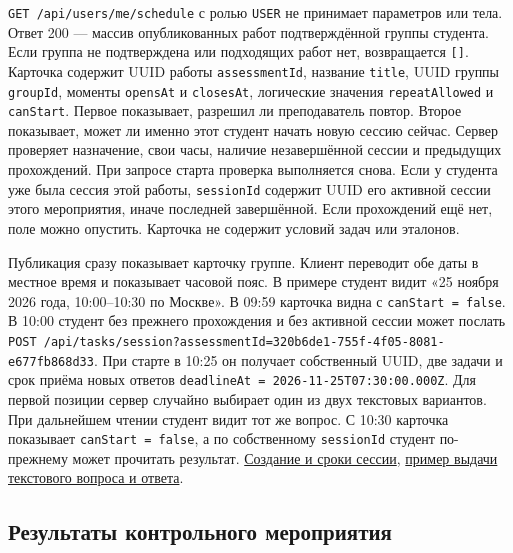 \documentclass[12pt,a4paper]{article}
\begin{document}
\hypertarget{расписание-студента}{}

\texttt{GET /\allowbreak{}api/\allowbreak{}users/\allowbreak{}me/\allowbreak{}schedule} с ролью \texttt{USER} не принимает параметров или тела. Ответ 200 --- массив опубликованных работ подтверждённой группы студента. Если группа не подтверждена или подходящих работ нет, возвращается \texttt{{[}{]}}. Карточка содержит UUID работы \texttt{assessment\allowbreak{}Id}, название \texttt{title}, UUID группы \texttt{groupId}, моменты \texttt{opensAt} и \texttt{closesAt}, логические значения \texttt{repeat\allowbreak{}Allowed} и \texttt{canStart}. Первое показывает, разрешил ли преподаватель повтор. Второе показывает, может ли именно этот студент начать новую сессию сейчас. Сервер проверяет назначение, свои часы, наличие незавершённой сессии и предыдущих прохождений. При запросе старта проверка выполняется снова. Если у студента уже была сессия этой работы, \texttt{sessionId} содержит UUID его активной сессии этого мероприятия, иначе последней завершённой. Если прохождений ещё нет, поле можно опустить. Карточка не содержит условий задач или эталонов.

Публикация сразу показывает карточку группе. Клиент переводит обе даты в местное время и показывает часовой пояс. В примере студент видит «25 ноября 2026 года, 10:00--10:30 по Москве». В 09:59 карточка видна с \texttt{can\allowbreak{}Start =\allowbreak{} false}. В 10:00 студент без прежнего прохождения и без активной сессии может послать \texttt{POST /\allowbreak{}api/\allowbreak{}tasks/\allowbreak{}session?\allowbreak{}assessment\allowbreak{}Id=\allowbreak{}320b6de1-\allowbreak{}755f-\allowbreak{}4f05-\allowbreak{}8081-\allowbreak{}e677fb868d33}. При старте в 10:25 он получает собственный UUID, две задачи и срок приёма новых ответов \texttt{deadline\allowbreak{}At =\allowbreak{} 2026-\allowbreak{}11-\allowbreak{}25T07:30:00.\allowbreak{}000Z}. Для первой позиции сервер случайно выбирает один из двух текстовых вариантов. При дальнейшем чтении студент видит тот же вопрос. С 10:30 карточка показывает \texttt{can\allowbreak{}Start =\allowbreak{} false}, а по собственному \texttt{sessionId} студент по-прежнему может прочитать результат. {\hyperlink{1-создание-сессии}{Создание и сроки сессии}}, {\hyperlink{как-передаётся-текстовый-вариант}{пример выдачи текстового вопроса и ответа}}.

\subsection{Результаты контрольного мероприятия}\label{ux440ux435ux437ux443ux43bux44cux442ux430ux442ux44b-ux43aux43eux43dux442ux440ux43eux43bux44cux43dux43eux433ux43e-ux43cux435ux440ux43eux43fux440ux438ux44fux442ux438ux44f}
\end{document}
